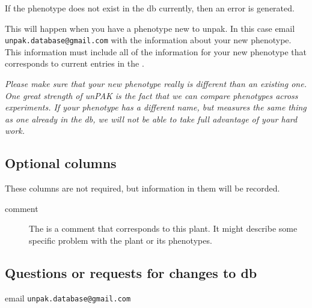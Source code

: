 If the phenotype does not exist in the db currently, then an error is
generated.  

This will happen when you have a phenotype new to unpak.  In this case
email \texttt{unpak.database@gmail.com} with the information about
your new phenotype.  This information must include all of the
information for your new phenotype that corresponds to current entries
in the .

\emph{Please make sure that your new phenotype really is different
  than an existing one.  One great strength of unPAK is the fact that we
  can compare phenotypes across experiments.  If your phenotype has a
  different name, but measures the same thing as one already in the
  db, we will not be able to take full advantage of your hard work.}

\subsection*{Optional columns}

These columns are not required, but information in them will be recorded.
\begin{description}
\item[comment] The is a comment that corresponds to this plant.  It might describe some specific problem with the plant or its phenotypes.
\end{description}

\subsection*{Questions or requests for changes to db}
email \texttt{unpak.database@gmail.com}



%
%
%

